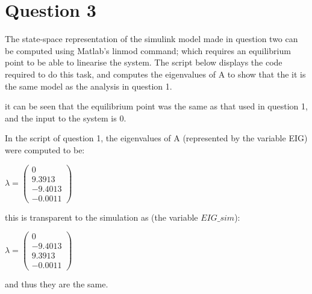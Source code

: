 \documentclass[12pt]{article}
\begin{document}
\clearpage


\section{Question 3}
The state-space representation of the simulink model made in question two can be computed using Matlab's linmod command; which requires an equilibrium point to be able to linearise the system. The script below displays the code required to do this task, and computes the eigenvalues of A to show that the it is the same model as the analysis in question 1.


\vspace{\baselineskip}



\vspace{\baselineskip}

it can be seen that the equilibrium point was the same as that used in question 1, and the input to the system is 0.

In the script of question 1, the eigenvalues of A (represented by the variable EIG) were computed to be:


\vspace{\baselineskip}


$\lambda = \left(\begin{array}{c} 0\\ 9.3913\\ -9.4013\\ -0.0011 \end{array}\right)$


\vspace{\baselineskip}


this is transparent to the simulation as (the variable $EIG\_sim$):


\vspace{\baselineskip}


$\lambda = \left(\begin{array}{c} 0\\ -9.4013\\ 9.3913\\ -0.0011 \end{array}\right)$


\vspace{\baselineskip}


and thus they are the same.


\vspace{\baselineskip}
\end{document}
